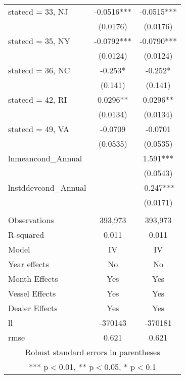 \begin{tabular}{lcc}
statecd = 33, NJ & -0.0516*** & -0.0515*** \\
 & (0.0176) & (0.0176) \\
statecd = 35, NY & -0.0792*** & -0.0790*** \\
 & (0.0124) & (0.0124) \\
statecd = 36, NC & -0.253* & -0.252* \\
 & (0.141) & (0.141) \\
statecd = 42, RI & 0.0296** & 0.0296** \\
 & (0.0134) & (0.0134) \\
statecd = 49, VA & -0.0709 & -0.0701 \\
 & (0.0535) & (0.0535) \\
lnmeancond\_Annual &  & 1.591*** \\
 &  & (0.0543) \\
lnstddevcond\_Annual &  & -0.247*** \\
 &  & (0.0171) \\
 &  &  \\
Observations & 393,973 & 393,973 \\
R-squared & 0.011 & 0.011 \\
Model & IV & IV \\
Year effects & No & No \\
Month Effects & Yes & Yes \\
Vessel Effects & Yes & Yes \\
Dealer Effects & Yes & Yes \\
ll & -370143 & -370181 \\
 rmse & 0.621 & 0.621 \\ \hline
\multicolumn{3}{c}{ Robust standard errors in parentheses} \\
\multicolumn{3}{c}{ *** p$<$0.01, ** p$<$0.05, * p$<$0.1} \\
\end{tabular}
